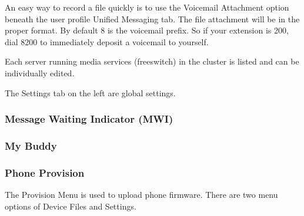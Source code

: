 \documentclass[letterpaper,10pt,english]{sphinxmanual}
\begin{document}
An easy way to record a file quickly is to use the Voicemail Attachment option beneath the user profile Unified Messaging tab. The file attachment will be in the proper format.
By default 8 is the voicemail prefix. So if your extension is 200, dial 8200 to immediately deposit a voicemail to yourself.


Each server running media services (freeswitch) in the cluster is listed and can be individually edited.


The Settings tab on the left are global settings.



\subsubsection{Message Waiting Indicator (MWI)}
\label{\detokenize{webui:message-waiting-indicator-mwi}}\label{\detokenize{webui:message-waiting-indicator}}\begin{quote}

\end{quote}


\subsubsection{My Buddy}
\label{\detokenize{webui:my-buddy}}\label{\detokenize{webui:id40}}\begin{quote}

\end{quote}


\subsubsection{Phone Provision}
\label{\detokenize{webui:phone-provision}}\label{\detokenize{webui:phone-provisioning}}
The Provision Menu is used to upload phone firmware. There are two menu options of Device Files and Settings.
\end{document}
